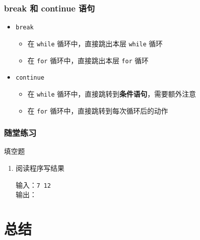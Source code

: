 \begin{frame}[fragile]
    \frametitle{break 和 continue 语句}

    \begin{itemize}
        \item \lstinline|break|
            \begin{itemize}
                \item 在 \lstinline|while| 循环中，直接跳出本层 \lstinline|while| 循环
                \item 在 \lstinline|for| 循环中，直接跳出本层 \lstinline|for| 循环
            \end{itemize}
        \item \lstinline|continue|
            \begin{itemize}
                \item 在 \lstinline|while| 循环中，直接跳转到\textbf{条件语句}，需要额外注意
                \item 在 \lstinline|for| 循环中，直接跳转到每次循环后的动作
            \end{itemize}
    \end{itemize}

\end{frame}

\begin{frame}[fragile]
    \frametitle{随堂练习}

    \begin{exampleblock}{填空题}

        \begin{enumerate}
            \item 阅读程序写结果
                

                输入：\lstinline|7 12|\\
                输出：
        \end{enumerate}

    \end{exampleblock}
\end{frame}


\section{总结}


